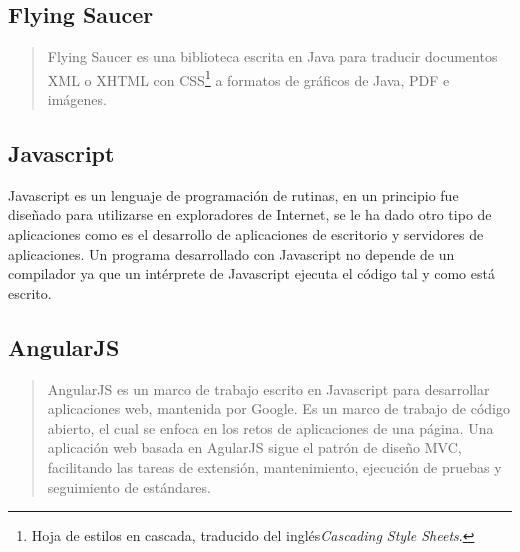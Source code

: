 \subsection{Flying Saucer}\label{sec:flying-saucer}
\begin{quote}
	Flying Saucer es una biblioteca escrita en Java para traducir documentos XML o XHTML con CSS\footnote{Hoja de estilos en cascada, traducido del inglés\textit{Cascading Style Sheets}.} a formatos de gráficos de Java, PDF e imágenes\cite{FlyingSaucer}.
\end{quote}

\subsection{Javascript}\label{sec:javascript}
Javascript es un lenguaje de programación de rutinas, en un principio fue diseñado para utilizarse en exploradores de Internet, se le ha dado otro tipo de aplicaciones como es el desarrollo de aplicaciones de escritorio y servidores de aplicaciones. Un programa desarrollado con Javascript no depende de un compilador ya que un intérprete de Javascript ejecuta el código tal y como está escrito\cite{LearningWebDesign}.

\subsection{AngularJS}\label{sec:angularjs}

\begin{quote}
	AngularJS es un marco de trabajo escrito en Javascript para desarrollar aplicaciones web, mantenida por Google. Es un marco de trabajo de código abierto, el cual se enfoca en los retos de aplicaciones de una página. Una aplicación web basada en AgularJS sigue el patrón de diseño MVC, facilitando las tareas de extensión, mantenimiento, ejecución de pruebas y seguimiento de estándares\cite{FullStackAngularJS}.
\end{quote}

